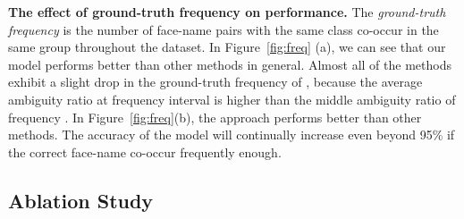\documentclass[letterpaper]{article} \usepackage{aaai20}  \usepackage{times}  \usepackage{helvet} \usepackage{courier}  \usepackage[hyphens]{url}  \usepackage{graphicx} \urlstyle{rm} \def\UrlFont{\rm}  \frenchspacing  \setlength{\pdfpagewidth}{8.5in}  \setlength{\pdfpageheight}{11in}  \frenchspacing
\begin{document}
\noindent\textbf{The effect of ground-truth frequency on performance.}
The \textit{ground-truth frequency} is the number of face-name pairs with the same class co-occur in the same group throughout the dataset.
In Figure~\ref{fig:freq} (a), we can see that our model performs better than other methods in general. Almost all of the methods exhibit a slight drop in the ground-truth frequency of , because the average ambiguity ratio at frequency interval is higher than the middle ambiguity ratio of frequency . In Figure~\ref{fig:freq}(b), the approach performs better than other methods. The accuracy of the model will continually increase even beyond 95\% if the correct face-name co-occur frequently enough. 









\begin{table}
  \caption{Ablation Study of Proposed Method DB-GAE}
  \label{sample-table2}
  \centering
  \end{table}
\subsection{Ablation Study}
\end{document}

